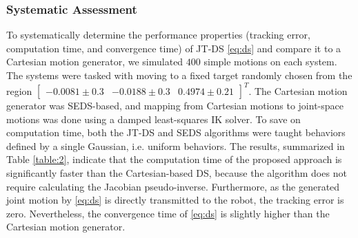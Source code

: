 \documentclass[letterpaper, 10 pt, conference,fleqn]{ieeeconf}
\begin{document}
\subsubsection{Systematic Assessment}
To systematically determine the performance properties (tracking error, computation time, and convergence time) of JT-DS \eqref{eq:ds} and compare it to a Cartesian motion generator, we simulated $400$ simple motions on each system. The systems were tasked with moving to a fixed target randomly chosen from the region $\begin{bmatrix} -0.0081\pm0.3&-0.0188\pm0.3&0.4974\pm0.21 \end{bmatrix}^T$. The Cartesian motion generator was SEDS-based, and mapping from Cartesian motions to joint-space motions was done using a damped least-squares IK solver. To save on computation time, both the JT-DS and SEDS algorithms were taught behaviors defined by a single Gaussian, i.e. uniform behaviors.  The results, summarized in Table \ref{table:2}, indicate that the computation time of the proposed approach is significantly faster than the Cartesian-based DS, because the algorithm does not require calculating the Jacobian pseudo-inverse. Furthermore, as the generated joint motion by \eqref{eq:ds} is directly transmitted to the robot, the tracking error is zero. Nevertheless, the convergence time of  \eqref{eq:ds} is slightly higher than the Cartesian motion generator.
\end{document}
